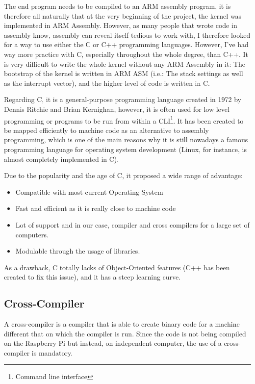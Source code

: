 The end program needs to be compiled to an ARM assembly program, it is therefore all naturally that at the very beginning of the project, the kernel was implemented in ARM Assembly. However, as many people that wrote code in assembly know, assembly can reveal itself tedious to work with, I therefore looked for a way to use either the C or C++ programming languages. However, I've had way more practice with C, especially throughout the whole degree, than C++. It is very difficult to write the whole kernel without any ARM Assembly in it: The bootstrap of the kernel is written in ARM ASM (i.e.: The stack settings as well as the interrupt vector), and the higher level of code is written in C.

Regarding C, it is a general-purpose programming language created in 1972 by Dennis Ritchie and Brian Kernighan\cite{ritchie_c}, however, it is often used for low level programming or programs to be run from within a CLI\footnote{Command line interface}. It has been created to be mapped efficiently to machine code as an alternative to assembly programming, which is one of the main reasons why it is still nowadays a famous programming language for operating system development (Linux, for instance, is almost completely implemented in C).

Due to the popularity and the age of C, it proposed a wide range of advantage:
\begin{itemize}
\item Compatible with most current Operating System
\item Fast and efficient as it is really close to machine code
\item Lot of support and in our case, compiler and cross compilers for a large set of computers.
\item Modulable through the usage of libraries. 
\end{itemize}

As a drawback, C totally lacks of Object-Oriented features (C++ has been created to fix this issue), and it has a steep learning curve.


\subsection{Cross-Compiler}

A cross-compiler is a compiler that is able to create binary code for a machine different that on which the compiler is run. Since the code is not being compiled on the Raspberry Pi but instead, on independent computer, the use of a cross-compiler is mandatory.


